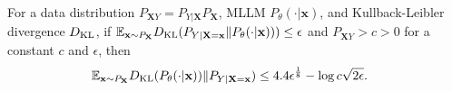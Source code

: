 \begin{lemma}\label{thm:cond_entropy_diff_bound-3} 
For a data distribution $P_{\mathbf{X}Y}=P_{Y|\mathbf{X}}P_{\mathbf{X}}$, MLLM $P_{\theta}(\cdot|\mathbf{x})$, and Kullback-Leibler divergence $D_{\rm KL}$, if ${\mathbb{E}_{\mathbf{x}\sim P_{\mathbf{X}}} D_{\rm KL}(P_{Y|\mathbf{X}=\mathbf{x}}\|P_{\theta}(\cdot|\mathbf{x}))})\leq \epsilon$ and $P_{\mathbf{X}Y}>c>0$ for a constant $c$ and $\epsilon$, then
\begin{equation*}
\begin{split}
    &{\mathbb{E}_{\mathbf{x}\sim P_{\mathbf{X}}} D_{\rm KL}(P_{\theta}(\cdot|\mathbf{x}))} \| P_{Y|\mathbf{X}=\mathbf{x}})\leq 4.4\epsilon^{\frac{1}{8}} - \log c \sqrt{2\epsilon}.
\end{split}
\end{equation*}
\end{lemma}
